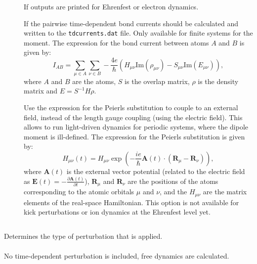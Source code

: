 \begin{description}
\item[] If outputs are printed for Ehrenfest or electron dynamics.

\item[] If the pairwise time-dependent bond currents should be calculated
    and written to the \verb|tdcurrents.dat| file. Only available for finite systems for the moment.
    The expression for the bond current between atoms $A$ and $B$ is given by:
\begin{equation*}
    I_{A B} = \sum_{\mu \in A} \sum_{\nu \in B} -\frac{4e}{\hbar}
    \left( H_{\mu \nu} \mathrm{Im}(\rho_{\mu \nu}) - S_{\mu \nu} \mathrm{Im}(E_{\mu \nu}) \right),
\end{equation*}
where $A$ and $B$ are the atoms, $S$ is the overlap matrix, $\rho$ is the density matrix
 and $E = S^{-1} H \rho$.

\item[] Use the expression for the Peierls substitution to couple to an external field,
     instead of the length gauge coupling (using the electric field). This allows to run light-driven dynamics for
     periodic systems, where the dipole moment is ill-defined. The expression for the Peierls substitution
     is given by:
\begin{equation*}
    H_{\mu \nu}(t) = H_{\mu \nu}
      \exp(-\frac{i e}{\hbar} \mathbf{A}(t) \cdot (\mathbf{R}_\mu - \mathbf{R}_\nu)),
\end{equation*}
where $\mathbf{A}(t)$ is the external vector potential (related to the electric field as
$\mathbf{E}(t) = -\frac{\partial \mathbf{A}(t)}{\partial t}$),
$\mathbf{R}_\mu$ and $\mathbf{R}_\nu$ are the positions of the atoms corresponding to the atomic orbitals
$\mu$ and $\nu$,  and the $H_{\mu \nu}$ are the matrix elements of the real-space Hamiltonian.
This option is not available for kick perturbations or ion dynamics at the Ehrenfest level yet.

\end{description}

\subsection{}
\label{sec:dftbp.tdpert}

Determines the type of perturbation that is applied.

\paragraph{}
No time-dependent perturbation is included, free dynamics are calculated.

